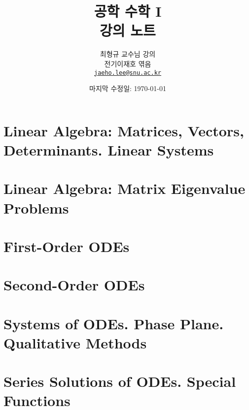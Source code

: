 \documentclass[
    draft,
    oneside,
    a4paper,
    microtype,
    adjustmath,
    finemath,
    itemph,
    nonfrench,
    11pt,
]{oblivoir}
\title{공학 수학 I\\강의 노트}
\author{최형규 교수님 강의\vspace{0.3cm}\\전기\textperiodcentered정보공학부 이재호 엮음\\\href{mailto:jaeho.lee@snu.ac.kr}{\texttt{jaeho.lee@snu.ac.kr}}}
\date{마지막 수정일: \today}
\numberwithin{equation}{section}
\theoremstyle{definition}
\theoremstyle{plain}
\theoremstyle{plain}
\theoremstyle{remark}
\theoremstyle{remark}
\theoremstyle{remark}
\begin{document}
\maketitle

\setcounter{section}{6}
\reversemarginpar{}
\section{Linear Algebra: Matrices, Vectors, Determinants. Linear Systems}


\section{Linear Algebra: Matrix Eigenvalue Problems}


\setcounter{section}{0}
\section{First-Order ODEs}


\section{Second-Order ODEs}


\setcounter{section}{3}
\section{Systems of ODEs. Phase Plane. Qualitative Methods}


\section{Series Solutions of ODEs. Special Functions}

\end{document}
